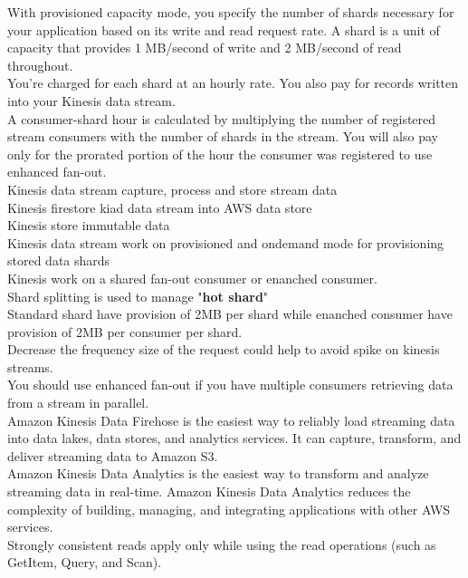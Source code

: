 \documentclass[12pt, letterpaper, twoside]{article}
\begin{document}
With provisioned capacity mode, you specify the number of shards necessary for your application based on its write and read request rate. 
A shard is a unit of capacity that provides 1 MB/second of write and 2 MB/second of read throughout.\\
You’re charged for each shard at an hourly rate. You also pay for records written into your Kinesis data stream.\\

A consumer-shard hour is calculated by multiplying the number of registered stream consumers with the number of shards in the stream. 
You will also pay only for the prorated portion of the hour the consumer was registered to use enhanced fan-out.\\

Kinesis data stream capture, process and store stream data\\
Kinesis firestore kiad data stream into AWS data store\\
Kinesis store immutable data\\
Kinesis data stream work on provisioned and ondemand mode for provisioning stored data shards\\
Kinesis work on a shared fan-out consumer or enanched consumer.\\
Shard splitting is used to manage "\textbf{hot shard}"\\
Standard shard have provision of 2MB per shard while enanched consumer have provision of 2MB per 
consumer per shard.\\

Decrease the frequency size of the request could help to avoid spike on kinesis streams.\\

You should use enhanced fan-out if you have multiple consumers retrieving data from a stream in parallel.\\

Amazon Kinesis Data Firehose is the easiest way to reliably load streaming data into data lakes, data stores, 
and analytics services. It can capture, transform, and deliver streaming data to Amazon S3.\\
Amazon Kinesis Data Analytics is the easiest way to transform and analyze streaming data in real-time.
Amazon Kinesis Data Analytics reduces the complexity of building, managing, and integrating applications 
with other AWS services.\\

Strongly consistent reads apply only while using the read operations (such as GetItem, Query, and Scan).\\
\end{document}
